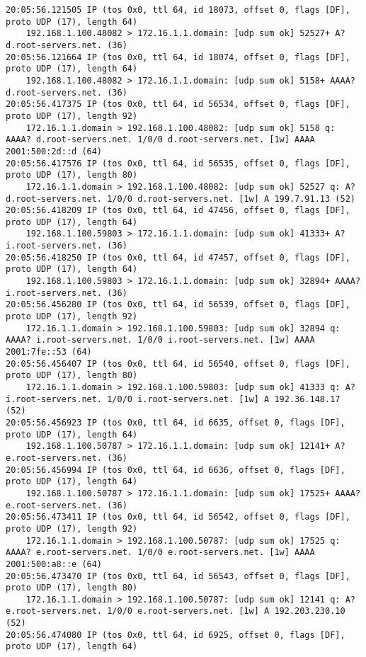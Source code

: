 \documentclass{article}
\begin{document}
{\begin{lstlisting}
20:05:56.121505 IP (tos 0x0, ttl 64, id 18073, offset 0, flags [DF], proto UDP (17), length 64)
    192.168.1.100.48082 > 172.16.1.1.domain: [udp sum ok] 52527+ A? d.root-servers.net. (36)
20:05:56.121664 IP (tos 0x0, ttl 64, id 18074, offset 0, flags [DF], proto UDP (17), length 64)
    192.168.1.100.48082 > 172.16.1.1.domain: [udp sum ok] 5158+ AAAA? d.root-servers.net. (36)
20:05:56.417375 IP (tos 0x0, ttl 64, id 56534, offset 0, flags [DF], proto UDP (17), length 92)
    172.16.1.1.domain > 192.168.1.100.48082: [udp sum ok] 5158 q: AAAA? d.root-servers.net. 1/0/0 d.root-servers.net. [1w] AAAA 2001:500:2d::d (64)
20:05:56.417576 IP (tos 0x0, ttl 64, id 56535, offset 0, flags [DF], proto UDP (17), length 80)
    172.16.1.1.domain > 192.168.1.100.48082: [udp sum ok] 52527 q: A? d.root-servers.net. 1/0/0 d.root-servers.net. [1w] A 199.7.91.13 (52)
20:05:56.418209 IP (tos 0x0, ttl 64, id 47456, offset 0, flags [DF], proto UDP (17), length 64)
    192.168.1.100.59803 > 172.16.1.1.domain: [udp sum ok] 41333+ A? i.root-servers.net. (36)
20:05:56.418250 IP (tos 0x0, ttl 64, id 47457, offset 0, flags [DF], proto UDP (17), length 64)
    192.168.1.100.59803 > 172.16.1.1.domain: [udp sum ok] 32894+ AAAA? i.root-servers.net. (36)
20:05:56.456280 IP (tos 0x0, ttl 64, id 56539, offset 0, flags [DF], proto UDP (17), length 92)
    172.16.1.1.domain > 192.168.1.100.59803: [udp sum ok] 32894 q: AAAA? i.root-servers.net. 1/0/0 i.root-servers.net. [1w] AAAA 2001:7fe::53 (64)
20:05:56.456407 IP (tos 0x0, ttl 64, id 56540, offset 0, flags [DF], proto UDP (17), length 80)
    172.16.1.1.domain > 192.168.1.100.59803: [udp sum ok] 41333 q: A? i.root-servers.net. 1/0/0 i.root-servers.net. [1w] A 192.36.148.17 (52)
20:05:56.456923 IP (tos 0x0, ttl 64, id 6635, offset 0, flags [DF], proto UDP (17), length 64)
    192.168.1.100.50787 > 172.16.1.1.domain: [udp sum ok] 12141+ A? e.root-servers.net. (36)
20:05:56.456994 IP (tos 0x0, ttl 64, id 6636, offset 0, flags [DF], proto UDP (17), length 64)
    192.168.1.100.50787 > 172.16.1.1.domain: [udp sum ok] 17525+ AAAA? e.root-servers.net. (36)
20:05:56.473411 IP (tos 0x0, ttl 64, id 56542, offset 0, flags [DF], proto UDP (17), length 92)
    172.16.1.1.domain > 192.168.1.100.50787: [udp sum ok] 17525 q: AAAA? e.root-servers.net. 1/0/0 e.root-servers.net. [1w] AAAA 2001:500:a8::e (64)
20:05:56.473470 IP (tos 0x0, ttl 64, id 56543, offset 0, flags [DF], proto UDP (17), length 80)
    172.16.1.1.domain > 192.168.1.100.50787: [udp sum ok] 12141 q: A? e.root-servers.net. 1/0/0 e.root-servers.net. [1w] A 192.203.230.10 (52)
20:05:56.474080 IP (tos 0x0, ttl 64, id 6925, offset 0, flags [DF], proto UDP (17), length 64)

\end{lstlisting}}
\end{document}
